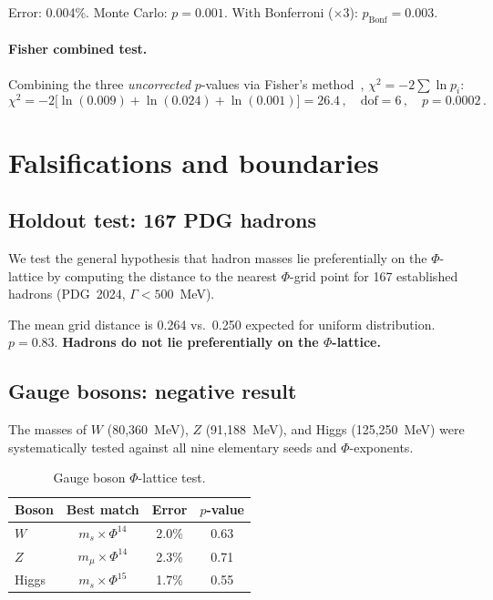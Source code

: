 \documentclass[11pt,a4paper]{article}
\begin{document}
\noindent
Error: 0.004\%. Monte Carlo: $p = 0.001$. With Bonferroni ($\times 3$):
$p_\text{Bonf} = 0.003$.

\paragraph{Fisher combined test.}
Combining the three \emph{uncorrected} $p$-values via
Fisher's method~\cite{Fisher1934},
$\chi^2 = -2\sum \ln p_i$:
\begin{equation}
  \chi^2 = -2\bigl[\ln(0.009) + \ln(0.024) + \ln(0.001)\bigr]
  = 26.4\,, \quad
  \text{dof} = 6\,, \quad
  p = 0.0002\,.
\end{equation}

\section{Falsifications and boundaries}
\label{sec:falsify}

\subsection{Holdout test: 167 PDG hadrons}
\label{sec:holdout}

We test the general hypothesis that hadron masses lie preferentially
on the $\Phi$-lattice by computing the distance to the nearest
$\Phi$-grid point for 167 established hadrons (PDG~2024,
$\Gamma < 500$~MeV).

The mean grid distance is 0.264 vs.\ 0.250 expected for uniform
distribution. $p = 0.83$.
\textbf{Hadrons do not lie preferentially on the $\Phi$-lattice.}

\subsection{Gauge bosons: negative result}
\label{sec:bosons}

The masses of $W$ (80{,}360~MeV), $Z$ (91{,}188~MeV), and Higgs
(125{,}250~MeV) were systematically tested against all nine elementary
seeds and $\Phi$-exponents.

\begin{table}[H]
\centering
\caption{Gauge boson $\Phi$-lattice test.}
\label{tab:bosons}
\begin{tabular}{@{}lccc@{}}
\toprule
Boson & Best match & Error & $p$-value \\
\midrule
$W$     & $m_s \times \Phi^{14}$ & 2.0\% & 0.63 \\
$Z$     & $m_\mu \times \Phi^{14}$ & 2.3\% & 0.71 \\
Higgs   & $m_s \times \Phi^{15}$ & 1.7\% & 0.55 \\
\bottomrule
\end{tabular}
\end{table}
\end{document}
